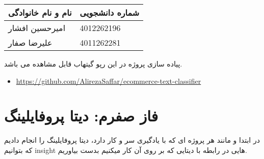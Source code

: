 \documentclass[a4paper,12pt]{article}
\begin{document}
	
	\begin{table}[h]
		\centering
		\begin{tabular}{|l|l|}
			\hline
			\textbf{نام و نام خانوادگی} & \textbf{شماره دانشجویی} \\
			\hline
			امیرحسین افشار & 4012262196 \\
			\hline
			علیرضا صفار & 4011262281 \\
			\hline
		\end{tabular}
	\end{table}
	
	
	پیاده سازی پروژه در این رپو گیتهاب قابل مشاهده می باشد.
	\begin{latin}
		\begin{itemize}
			\item \href{https://github.com/AlirezaSaffar/ecommerce-text-classifier}{https://github.com/AlirezaSaffar/ecommerce-text-classifier}
		\end{itemize}
	\end{latin}
	
	
	
	
	
	\section*{فاز صفرم: دیتا پروفایلینگ}
	
	در ابتدا و مانند هر پروژه ای که با یادگیری سر و کار دارد، دیتا پروفایلینگ را انجام دادیم که بتوانیم insight هایی در رابطه با دیتایی که بر روی آن کار میکنیم بدست بیاوریم.
	
\end{document}
